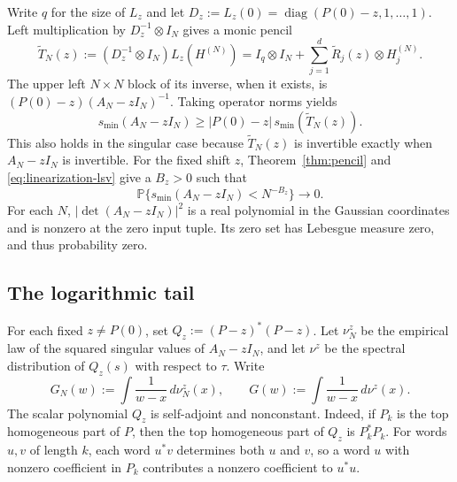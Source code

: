 Write $q$ for the size of $L_z$ and let $D_z:=L_z(0)=\operatorname{diag}(P(0)-z,1,\ldots,1)$.
Left multiplication by $D_z^{-1}\otimes I_N$ gives a monic pencil
\[
 \widetilde T_N(z):=(D_z^{-1}\otimes I_N)L_z(H^{(N)})
    =I_q\otimes I_N+\sum_{j=1}^d\widetilde R_j(z)\otimes H_j^{(N)}.
\]
The upper left $N\times N$ block of its inverse, when it exists, is $(P(0)-z)(A_N-zI_N)^{-1}$.
Taking operator norms yields
\begin{equation}\label{eq:linearization-lsv}
 s_{\min}(A_N-zI_N)\ge |P(0)-z|\,s_{\min}(\widetilde T_N(z)).
\end{equation}
This also holds in the singular case because $\widetilde T_N(z)$ is invertible exactly when $A_N-zI_N$ is invertible.
For the fixed shift $z$, Theorem~\ref{thm:pencil} and \eqref{eq:linearization-lsv} give a $B_z>0$ such that
\begin{equation}\label{eq:polynomial-floor}
 \mathbb P\{s_{\min}(A_N-zI_N)<N^{-B_z}\}\longrightarrow 0 .
\end{equation}
For each $N$, $|\det(A_N-zI_N)|^2$ is a real polynomial in the Gaussian coordinates and is nonzero at the zero input tuple.
Its zero set has Lebesgue measure zero, and thus probability zero.

\subsection{The logarithmic tail}\label{subsec:log-tail}

For each fixed $z\ne P(0)$, set $Q_z:=(P-z)^*(P-z)$.
Let $\nu_N^z$ be the empirical law of the squared singular values of $A_N-zI_N$, and let $\nu^z$ be the spectral distribution of $Q_z(s)$ with respect to $\tau$.
Write
\[
 G_N(w):=\int\frac{1}{w-x}\,d\nu_N^z(x),\qquad
 G(w):=\int\frac{1}{w-x}\,d\nu^z(x).
\]
The scalar polynomial $Q_z$ is self-adjoint and nonconstant.
Indeed, if $P_k$ is the top homogeneous part of $P$, then the top homogeneous part of $Q_z$ is $P_k^*P_k$.
For words $u,v$ of length $k$, each word $u^*v$ determines both $u$ and $v$, so a word $u$ with nonzero coefficient in $P_k$ contributes a nonzero coefficient to $u^*u$.

